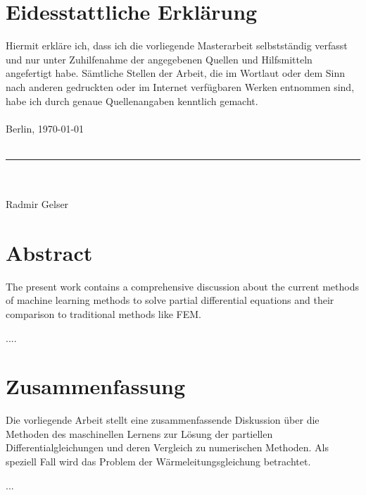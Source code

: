 \section*{Eidesstattliche Erklärung} 

Hiermit erkläre ich, dass ich die vorliegende Masterarbeit selbstständig verfasst und nur unter
Zuhilfenahme der angegebenen Quellen und Hilfsmitteln angefertigt habe. Sämtliche Stellen der Arbeit, die im Wortlaut oder dem Sinn nach anderen gedruckten oder im Internet verfügbaren Werken entnommen sind, habe ich durch genaue Quellenangaben
kenntlich gemacht.\\
\vspace{20pt}\\
Berlin, \today\\
\vspace{15pt}\\
\par\noindent\rule{0.25\textwidth}{0.4pt}\\\\
Radmir Gelser


\newpage
\section*{Abstract} 	%

The present work contains a comprehensive discussion about the current methods of machine learning methods to solve partial differential equations and their comparison to traditional methods like FEM. 

.... 

\section*{Zusammenfassung}

Die vorliegende Arbeit stellt eine zusammenfassende Diskussion über die Methoden des maschinellen Lernens zur Lösung der partiellen Differentialgleichungen und deren Vergleich zu numerischen Methoden. Als speziell Fall wird das Problem der Wärmeleitungsgleichung betrachtet. 

...  